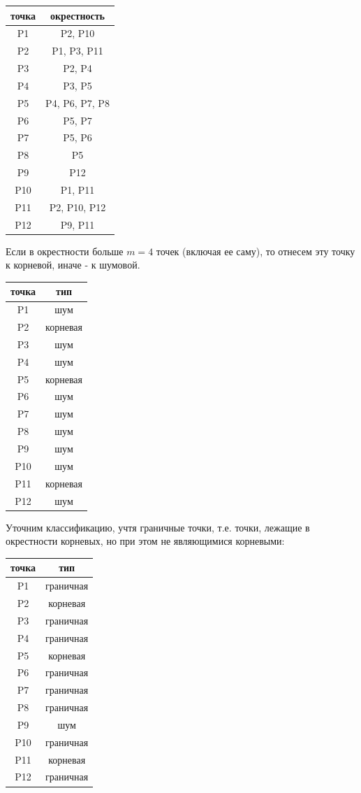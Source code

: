 \begin{center}
\begin{tabular}{ |c|c| } 
 \hline
 точка & окрестность \\\hline
 P1 & P2, P10\\ 
 P2 & P1, P3, P11\\ 
 P3 & P2, P4\\ 
 P4 & P3, P5\\
 P5 & P4, P6, P7, P8\\
 P6 & P5, P7\\
 P7 & P5, P6\\
 P8 & P5\\
 P9 & P12\\
 P10 & P1, P11\\
 P11 & P2, P10, P12\\
 P12 & P9, P11\\
 \hline
\end{tabular}
\end{center}

Если в окрестности больше $m=4$ точек (включая ее саму), то отнесем эту точку к корневой, иначе - к шумовой.

\begin{center}
\begin{tabular}{ |c|c| } 
 \hline
 точка & тип \\\hline
 P1 & шум\\ 
 P2 & корневая\\ 
 P3 & шум\\ 
 P4 & шум\\
 P5 & корневая\\
 P6 & шум\\
 P7 & шум\\
 P8 & шум\\
 P9 & шум\\
 P10 & шум\\
 P11 & корневая\\
 P12 & шум\\
 \hline
\end{tabular}
\end{center}

Уточним классификацию, учтя граничные точки, т.е. точки, лежащие в окрестности корневых, но при этом не являющимися корневыми:
\begin{center}
\begin{tabular}{ |c|c| } 
 \hline
 точка & тип \\\hline
 P1 & граничная\\ 
 P2 & корневая\\ 
 P3 & граничная\\ 
 P4 & граничная\\
 P5 & корневая\\
 P6 & граничная\\
 P7 & граничная\\
 P8 & граничная\\
 P9 & шум\\
 P10 & граничная\\
 P11 & корневая\\
 P12 & граничная\\
 \hline
\end{tabular}
\end{center}

